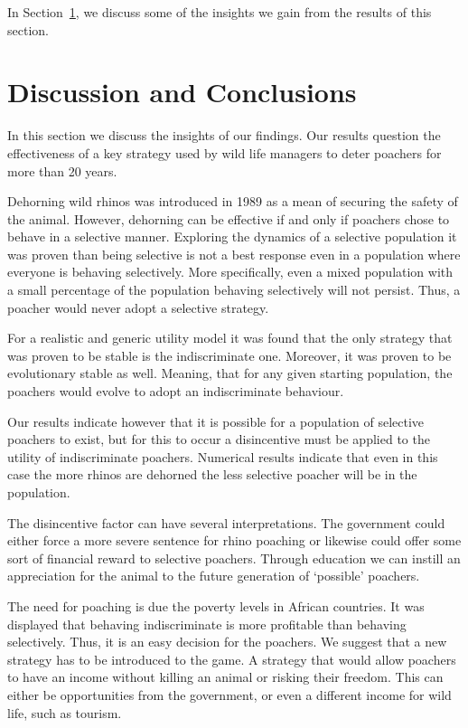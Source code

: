 \documentclass[10pt]{article}
\begin{document}
In Section~\ref{section:discussion}, we discuss some of the insights we
gain from the results of this section.

\section{Discussion and Conclusions}
\label{section:discussion}

In this section we discuss the insights of our findings. Our results question
the effectiveness of a key strategy used by wild life managers to deter poachers
for more than 20 years. 

Dehorning wild rhinos was introduced in 1989 as a mean of securing the
safety of the animal. However, dehorning can be effective if and only if
poachers chose to behave in a selective manner. Exploring the
dynamics of a selective population it was proven than being selective is not
a best response even in a population where everyone is behaving selectively.
More specifically, even a mixed population with a small percentage of the 
population behaving selectively will not persist. Thus, a poacher would never
adopt a selective strategy. 

For a realistic and generic utility model it was found that
the only strategy that was proven to be stable is the indiscriminate one.
Moreover, it was proven to be evolutionary stable as well. Meaning, 
that for any given starting population, the poachers would evolve to adopt an
indiscriminate behaviour.

Our results indicate however that it is possible for a population of selective
poachers to exist, but for this to occur a disincentive must be applied to the
utility of indiscriminate poachers. Numerical results indicate that even in this
case the more rhinos are dehorned the less selective poacher will be in the population.

The disincentive factor can have several interpretations. The government
could either force a more severe sentence for rhino poaching or likewise could 
offer some sort of financial reward to selective poachers. Through education we
can instill an appreciation for the animal to the future generation of `possible' 
poachers.

The need for poaching is due the poverty levels in African countries. It was 
displayed that behaving indiscriminate is more profitable than behaving 
selectively. Thus, it is an easy decision for the poachers. We suggest that a
new strategy has to be introduced to the game. A strategy that would allow 
poachers to have an income without killing an animal or risking their freedom. 
This can either be opportunities from the government, or even a different 
income for wild life, such as tourism.
\end{document}
